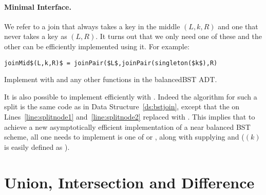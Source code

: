 \paragraph{Minimal Interface.}
We refer to a join that always takes a key in the middle
$(L,k,R)$ and one that never takes a key as
$(L,R)$.  It turns out that we only need one of these
and the other can be efficiently implemented using it.  For
example:
\begin{lstlisting}[numbers=none]
joinMid$(L,k,R)$ = joinPair($L$,joinPair(singleton($k$),R)
\end{lstlisting}
\begin{exercise}
Implement  with  and any other
functions in the balancedBST ADT.
\end{exercise}
It is also possible to implement  efficiently with
.  Indeed the algorithm for such a split is the same code
as in Data Structure~\ref{ds:bstjoin}, except that the
 on Lines~\ref{line:splitnode1} and~\ref{line:splitnode2}
replaced with .
This implies that to achieve a new asymptotically efficient
implementation of a near balanced BST scheme, all one needs to
implement is one of  or , along with
supplying  and  ($(k)$ is
easily defined as ).  

\begin{comment}
\begin{exercise}
Write a version of \cname{insert} that takes a function $f : \data
\times \data$ and if the insertion key $k$ is already in the tree
applies $f$ to the old and new value to return the value to associate
with the key.
\end{exercise}
\end{comment}

\section{Union, Intersection and Difference}
\label{sec:union}

